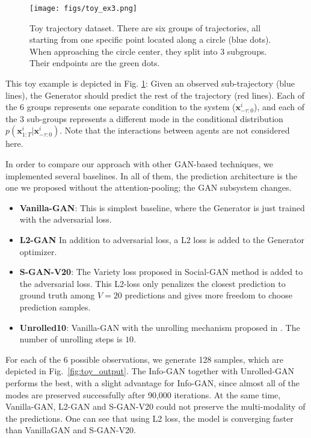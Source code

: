 \documentclass[10pt,twocolumn,letterpaper]{article}
\begin{document}
\begin{figure}[t!]
	\centering
	\texttt{[image: figs/toy\_ex3.png]}
	\caption{Toy trajectory dataset. There are six groups of trajectories, all starting from one specific point located along a circle (blue dots). When approaching the circle center, they split into 3 subgroups. Their endpoints are the green dots.}
	\vspace{-0.4cm}
	\label{toy_example_fig}	
\end{figure}

This toy example is depicted in Fig. \ref{toy_example_fig}: Given an observed sub-trajectory (blue lines), the Generator should predict the rest of the trajectory (red lines). Each of the 6 groups represents one separate condition to the system ($\mathbf{x}^i_{-\tau:0}$), and each of the 3 sub-groups represents a different mode in the conditional distribution $p(\mathbf{x}^i_{1:T}|\mathbf{x}^i_{-\tau:0})$. Note that the interactions between agents are not considered here.


In order to compare our approach with other GAN-based techniques, we implemented several baselines. In all of them, the prediction architecture is the one we proposed without the attention-pooling; the GAN subsystem changes.

\begin{itemize}[leftmargin=*]
	\item \textbf{Vanilla-GAN}: This is simplest baseline, where the Generator is just trained with the adversarial loss.
	
	\item \textbf{L2-GAN} In addition to adversarial loss, a L2 loss is added to the Generator optimizer.
	
	\item \textbf{S-GAN-V20}: The Variety loss proposed in Social-GAN method \cite{SocialGAN2018} is added to the adversarial loss. This L2-loss only penalizes the closest prediction to ground truth among $V=20$ predictions and gives more freedom to choose prediction samples.

	\item \textbf{Unrolled10}: Vanilla-GAN with the unrolling mechanism proposed in \cite{UnrolledGA2017}. The number of unrolling steps is $10$.
	
	
\end{itemize}

For each of the 6 possible observations, we generate 128 samples, which are depicted in Fig.~\ref{fig:toy_output}. The Info-GAN together with Unrolled-GAN performs the best, with a slight advantage for Info-GAN, since almost all of the modes are preserved successfully after 90,000 iterations. At the same time, Vanilla-GAN, L2-GAN and S-GAN-V20 could not preserve the multi-modality of the predictions. One can see that using L2 loss, the model is converging faster than VanillaGAN and S-GAN-V20.
\end{document}
